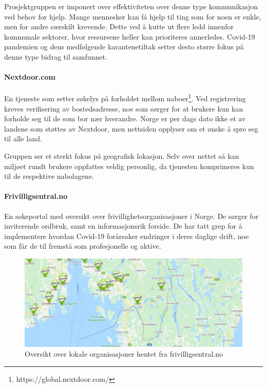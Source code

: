 \vspace{5mm} %

Prosjektgruppen er imponert over effektiviteten over denne type kommunikasjon ved behov for hjelp. Mange mennesker kan få hjelp til ting som for noen er enkle, men for andre særskilt krevende. Dette ved å kutte ut flere ledd innenfor kommunale sektorer, hvor ressursene heller kan prioriteres annerledes. Covid-19 pandemien og dens medfølgende karantenetiltak setter desto større fokus på denne type bidrag til samfunnet.

\vspace{5mm} %

\paragraph{Nextdoor.com} En tjeneste som setter søkelys på forholdet mellom naboer\footnote{https://global.nextdoor.com/}. Ved registrering kreves verifisering av bostedsadresse, noe som sørger for at brukere kun kan forholde seg til de som bor nær hverandre. Norge er per dags dato ikke et av landene som støttes av Nextdoor, men nettsiden opplyser om et ønske å spre seg til alle land.

\vspace{5mm} %

Gruppen ser et sterkt fokus på geografisk lokasjon. Selv over nettet så kan miljøet rundt brukere oppfattes veldig personlig, da tjenesten komprimeres kun til de respektive nabolagene.

\vspace{5mm} %

\paragraph{Frivilligsentral.no} En søkeportal med oversikt over frivillighetsorganisasjoner i Norge. De sørger for inviterende ordbruk, samt en informasjonsrik forside. De har tatt grep for å implementere hvordan Covid-19 forårsaker endringer i deres daglige drift, noe som får de til fremstå som profesjonelle og aktive.

\begin{figure}[H]
\centering
\includegraphics[width=1\textwidth]{Illustrasjoner/frivillig_kart.png}
\caption{Oversikt over lokale organisasjoner hentet fra frivilligsentral.no}
\end{figure}

